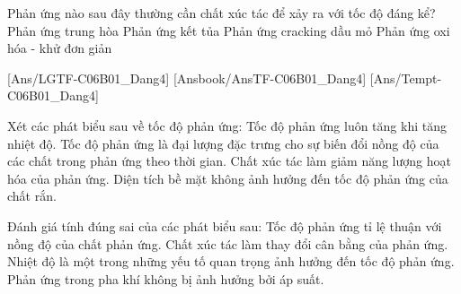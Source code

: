 \documentclass[Main.tex]{subfiles}
\begin{document}
\begin{ex}
	Phản ứng nào sau đây thường cần chất xúc tác để xảy ra với tốc độ đáng kể?
	\choice
	{Phản ứng trung hòa}
	{Phản ứng kết tủa}
	{\True Phản ứng cracking dầu mỏ}
	{Phản ứng oxi hóa - khử đơn giản}
\end{ex}
[Ans/LGTF-C06B01_Dang4]
[Ansbook/AnsTF-C06B01_Dang4]
[Ans/Tempt-C06B01_Dang4]
\begin{ex}
	Xét các phát biểu sau về tốc độ phản ứng:
	\choiceTF
	{Tốc độ phản ứng luôn tăng khi tăng nhiệt độ.}
	{\True Tốc độ phản ứng là đại lượng đặc trưng cho sự biến đổi nồng độ của các chất trong phản ứng theo thời gian.}
	{\True Chất xúc tác làm giảm năng lượng hoạt hóa của phản ứng.}
	{Diện tích bề mặt không ảnh hưởng đến tốc độ phản ứng của chất rắn.}
\end{ex}
\begin{ex}
	Đánh giá tính đúng sai của các phát biểu sau:
	\choiceTF
	{Tốc độ phản ứng tỉ lệ thuận với nồng độ của chất phản ứng.}
	{Chất xúc tác làm thay đổi cân bằng của phản ứng.}
	{\True Nhiệt độ là một trong những yếu tố quan trọng ảnh hưởng đến tốc độ phản ứng.}
	{Phản ứng trong pha khí không bị ảnh hưởng bởi áp suất.}
\end{ex}
\end{document}
